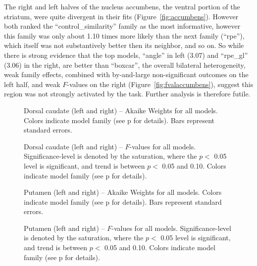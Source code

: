 The right and left halves of the nucleus accumbens, the ventral portion of the striatum, were quite divergent in their fits (Figure~\ref{fig:accumbens}).  However both ranked the ``control\_similarity'' family as the most informative, however this family was only about 1.10 times more likely than the next family (``rpe''), which itself was not substantively better then its neighbor, and so on.  So while there is strong evidence that the top models, ``angle'' in left (3.07) and ``rpe\_gl'' (3.06) in the right, are better than ``boxcar'', the overall bilateral heterogeneity, weak family effects, combined with by-and-large non-significant outcomes on the left half, and weak $F$-values on the right (Figure~\ref{fig:fvalaccumbens}), suggest this region was not strongly activated by the task.  Further analysis is therefore futile.

\begin{figure}[tp]
    \centering
    \caption{Dorsal caudate (left and right) -- Akaike Weights for all models.  Colors indicate model family (see p\pageref{sub:cmb} for details). Bars represent standard errors.}
    \label{fig:caudate}
\end{figure}
\begin{figure}[tp]
    \centering
    \caption{Dorsal caudate (left and right) -- $F$-values for all models.  Significance-level is denoted by the saturation, where the $p <$ 0.05 level is significant, and trend is between $p <$ 0.05 and 0.10.  Colors indicate model family (see p\pageref{sub:cmb} for details).}
    \label{fig:fvalcaudate}
\end{figure}

\begin{figure}[tp]
    \centering
    \caption{Putamen (left and right) -- Akaike Weights for all models.  Colors indicate model family (see p\pageref{sub:cmb} for details). Bars represent standard errors.}
    \label{fig:putamen}
\end{figure}
\begin{figure}[tp]
    \centering
    \caption{Putamen (left and right) -- $F$-values for all models.
    Significance-level is denoted by the saturation, where the $p <$ 0.05 level is
    significant, and trend is between $p <$ 0.05 and 0.10.  Colors indicate model family (see p\pageref{sub:cmb} for details).}
    \label{fig:fvalputamen}
\end{figure}



